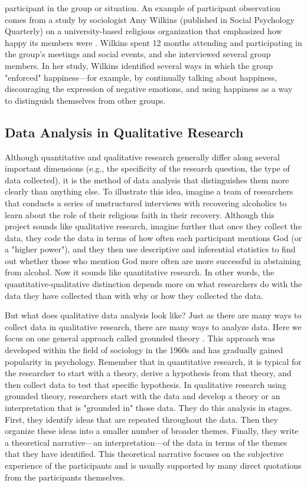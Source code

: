 participant in the group or situation. An example of participant observation comes from a study by sociologist Amy Wilkins (published in Social Psychology Quarterly) on a university-based religious organization that emphasized how happy its members were \citep{wilkins_happier_2008}. Wilkins spent 12 months attending and participating in the group's meetings and social events, and she interviewed several group members. In her study, Wilkins identified several ways in which the group "enforced" happiness---for example, by continually talking about happiness, discouraging the expression of negative emotions, and using happiness as a way to distinguish themselves from other groups.

\subsection{Data Analysis in Qualitative Research}

Although quantitative and qualitative research generally differ along several important dimensions (e.g., the specificity of the research question, the type of data collected), it is the method of data analysis that distinguishes them more clearly than anything else. To illustrate this idea, imagine a team of researchers that conducts a series of unstructured interviews with recovering alcoholics to learn about the role of their religious faith in their recovery. Although this project sounds like qualitative research, imagine further that once they collect the data, they code the data in terms of how often each participant mentions God (or a "higher power"), and they then use descriptive and inferential statistics to find out whether those who mention God more often are more successful in abstaining from alcohol. Now it sounds like quantitative research. In other words, the quantitative-qualitative distinction depends more on what researchers do with the data they have collected than with why or how they collected the data.

But what does qualitative data analysis look like? Just as there are many ways to collect data in qualitative research, there are many ways to analyze data. Here we focus on one general approach called grounded theory \citep{glaser_discovery_1968}. This approach was developed within the field of sociology in the 1960s and has gradually gained popularity in psychology. Remember that in quantitative research, it is typical for the researcher to start with a theory, derive a hypothesis from that theory, and then collect data to test that specific hypothesis. In qualitative research using grounded theory, researchers start with the data and develop a theory or an interpretation that is "grounded in" those data. They do this analysis in stages. First, they identify ideas that are repeated throughout the data. Then they organize these ideas into a smaller number of broader themes. Finally, they write a theoretical narrative---an interpretation---of the data in terms of the themes that they have identified. This theoretical narrative focuses on the subjective experience of the participants and is usually supported by many direct quotations from the participants themselves.


